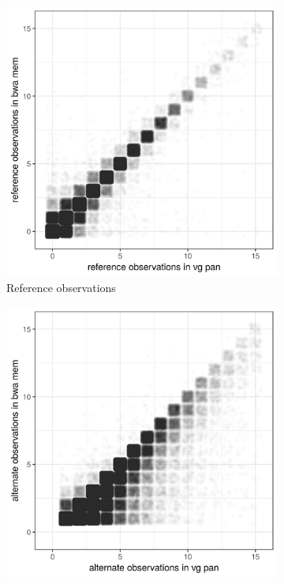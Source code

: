 \documentclass[a4paper,12pt,numbered,oneside]{Classes/PhDThesisPSnPDF}
\begin{document}
\begin{figure}[htbp!] 
  \centering
  \begin{subfigure}[t]{0.49\textwidth}
    \includegraphics[width=1.0\textwidth]{Chapter3/Figs/ENCFF486KYD_RO_vg_pan_vs_bwa.png}
    \caption{Reference observations}
    \label{subfig:chip_seq_ref_obs}
  \end{subfigure}
  \begin{subfigure}[t]{0.49\textwidth}
    \includegraphics[width=1.0\textwidth]{Chapter3/Figs/ENCFF486KYD_AO_vg_pan_vs_bwa.png}

\end{subfigure}
\end{figure}
\end{document}
